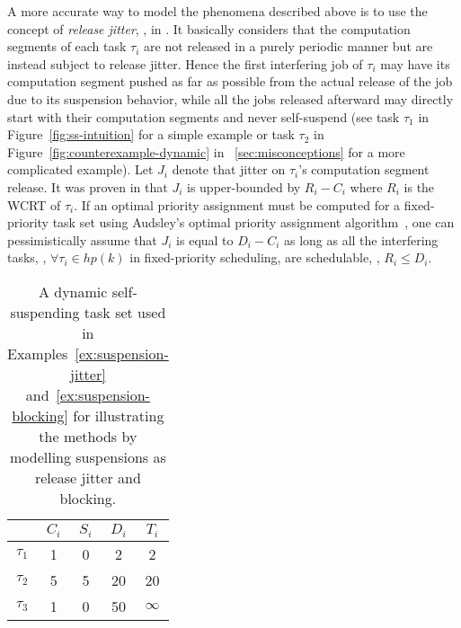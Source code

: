 \label{sec:model-interfering-jitter}

A more accurate way to model the phenomena described above is to use the concept of \emph{release jitter}, \eg, in \cite{ecrts15nelissen,BletsasReport2015,huangpass:dac2015,Raj:suspension1991,ECRTS-AudsleyB04,RTAS-AudsleyB04,RTCSA-KimCPKH95}.
 It basically considers 
that the computation segments of each task $\tau_i$ are not released in a purely periodic manner but are instead subject to release jitter. 
Hence the first interfering job of $\tau_i$ may have its computation segment pushed as far as possible from the actual release of the job 
due to its suspension behavior, while all the jobs released afterward may directly start with their computation segments and never 
self-suspend (see task $\tau_1$ in Figure~\ref{fig:ss-intuition} for a simple example or task $\tau_2$ in Figure~\ref{fig:counterexample-dynamic} in \mysectionref{}~\ref{sec:misconceptions} for a more complicated example). Let $J_i$ denote that jitter on $\tau_i$'s computation segment release. 
It was proven in \cite{ecrts15nelissen,BletsasReport2015} that $J_i$ is upper-bounded by $R_i-C_i$ where $R_i$ is the WCRT of $\tau_i$. 
If an optimal priority assignment must be computed for a fixed-priority task set using Audsley's optimal priority assignment 
algorithm~\cite{Audsley1991aOPA}, one can pessimistically assume that $J_i$ is equal to $D_i-C_i$ \cite{huangpass:dac2015,Raj:suspension1991} 
as long as all the interfering tasks, \ie, $\forall \tau_i \in hp(k)$ in fixed-priority scheduling, are schedulable, \ie, $R_i \leq D_i$.


\begin{table}[t]
\centering
    \begin{tabular}{|c|c|c|c|c|}
 \hline
        & $C_i$ &  $S_i$&  $D_i$ & $T_i$\\ 
        \hline
        $\tau_1$ & 1 & 0 &  2 & 2\\ 
        $\tau_2$ &  5&  5& 20 & 20 \\ 
        $\tau_3$ & 1 & 0  & 50 & $\infty$ \\ 
        \hline
    \end{tabular} 
    \caption{A dynamic self-suspending task set used in Examples~\ref{ex:suspension-jitter} and~\ref{ex:suspension-blocking} for illustrating the methods by modelling suspensions as release jitter and blocking.}
    \label{table:dynamic-example}
\end{table}

